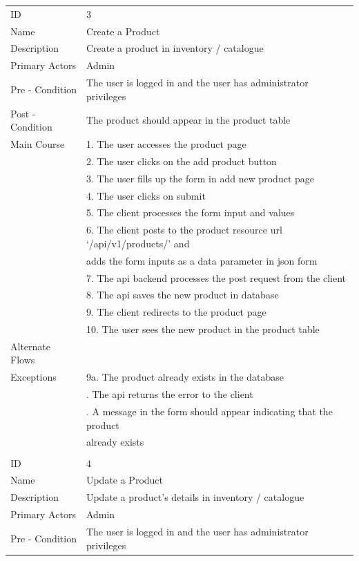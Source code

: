 \documentclass{report}
\begin{document}
\begin{tabular}{ l l }					
ID 					& 3 \\
Name 				& Create a Product\\
Description 			& Create a product in inventory / catalogue \\ 
Primary Actors 		& Admin \\
Pre - Condition 		& The user is logged in and the user has administrator privileges \\ 
Post - Condition 	& The product should appear in the product table \\ 
Main Course			& 1. The user accesses the product page \\
					& 2. The user clicks on the add product button \\
					& 3. The user fills up the form in add new product page \\
					& 4. The user clicks on submit \\
					& 5. The client processes the form input and values \\
					& 6. The client posts to the product resource url ‘/api/v1/products/’ and \\ 
					& \quad \thinspace adds the form inputs as a data parameter in json form \\
					& 7. The api backend processes the post request from the client \\
					& 8. The api saves the new product in database \\
					& 9. The client redirects to the product page \\
					& 10. The user sees the new product in the product table \\
Alternate Flows		& \\
Exceptions 			& 9a. The product already exists in the database \\
					& \qquad 1. The api returns the error to the client \\
					& \qquad 2. A message in the form should appear indicating that the product \\ 
					& \qquad \quad \thinspace already exists \\ \\
ID 					& 4 \\
Name 				& Update a Product\\
Description 			& Update a product’s details in inventory / catalogue \\ 
Primary Actors 		& Admin \\
Pre - Condition 		& The user is logged in and the user has administrator privileges \\ 

\end{tabular}
\end{document}
